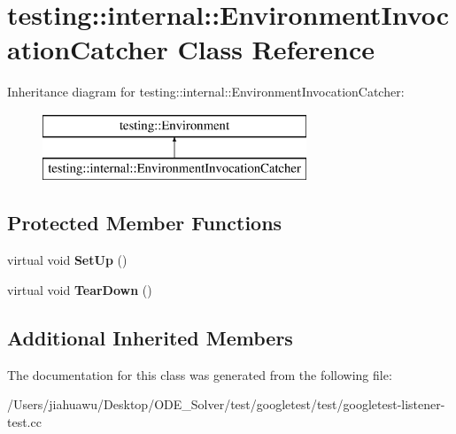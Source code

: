 \hypertarget{classtesting_1_1internal_1_1_environment_invocation_catcher}{}\section{testing\+:\+:internal\+:\+:Environment\+Invocation\+Catcher Class Reference}
\label{classtesting_1_1internal_1_1_environment_invocation_catcher}
Inheritance diagram for testing\+:\+:internal\+:\+:Environment\+Invocation\+Catcher\+:\begin{figure}[H]
\begin{center}
\leavevmode
\includegraphics[height=2.000000cm]{classtesting_1_1internal_1_1_environment_invocation_catcher}
\end{center}
\end{figure}
\subsection*{Protected Member Functions}
\begin{DoxyCompactItemize}
\item 
\mbox{\label{classtesting_1_1internal_1_1_environment_invocation_catcher_a325365b0ecfa71a4a767d7a1817c9663}} 
virtual void {\bfseries Set\+Up} ()
\item 
\mbox{\label{classtesting_1_1internal_1_1_environment_invocation_catcher_afc89ee0a8e32e6746a89fcc1682f62e9}} 
virtual void {\bfseries Tear\+Down} ()
\end{DoxyCompactItemize}
\subsection*{Additional Inherited Members}


The documentation for this class was generated from the following file\+:\begin{DoxyCompactItemize}
\item 
/\+Users/jiahuawu/\+Desktop/\+O\+D\+E\+\_\+\+Solver/test/googletest/test/googletest-\/listener-\/test.\+cc\end{DoxyCompactItemize}
